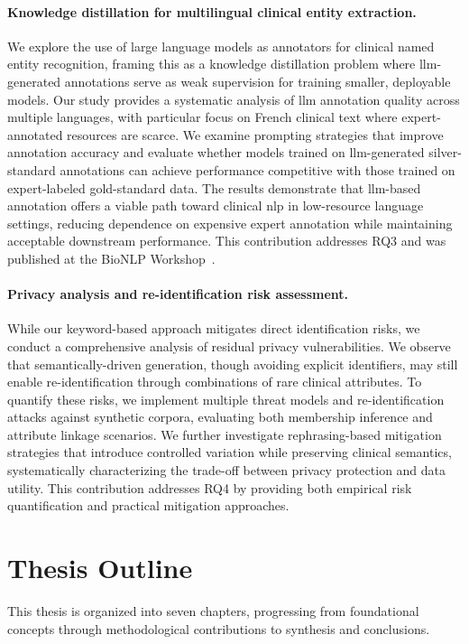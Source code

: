 \paragraph{Knowledge distillation for multilingual clinical entity extraction.} We explore the use of large language models as annotators for clinical named entity recognition, framing this as a knowledge distillation problem where \gls{llm}-generated annotations serve as weak supervision for training smaller, deployable models. Our study provides a systematic analysis of \gls{llm} annotation quality across multiple languages, with particular focus on French clinical text where expert-annotated resources are scarce. We examine prompting strategies that improve annotation accuracy and evaluate whether models trained on \gls{llm}-generated silver-standard annotations can achieve performance competitive with those trained on expert-labeled gold-standard data. The results demonstrate that \gls{llm}-based annotation offers a viable path toward clinical \gls{nlp} in low-resource language settings, reducing dependence on expensive expert annotation while maintaining acceptable downstream performance. This contribution addresses RQ3 and was published at the BioNLP Workshop~\citep{meoni2023large}.

\paragraph{Privacy analysis and re-identification risk assessment.} While our keyword-based approach mitigates direct identification risks, we conduct a comprehensive analysis of residual privacy vulnerabilities. We observe that semantically-driven generation, though avoiding explicit identifiers, may still enable re-identification through combinations of rare clinical attributes. To quantify these risks, we implement multiple threat models and re-identification attacks against synthetic corpora, evaluating both membership inference and attribute linkage scenarios. We further investigate rephrasing-based mitigation strategies that introduce controlled variation while preserving clinical semantics, systematically characterizing the trade-off between privacy protection and data utility. This contribution addresses RQ4 by providing both empirical risk quantification and practical mitigation approaches.

\section{Thesis Outline}
This thesis is organized into seven chapters, progressing from foundational concepts through methodological contributions to synthesis and conclusions.

